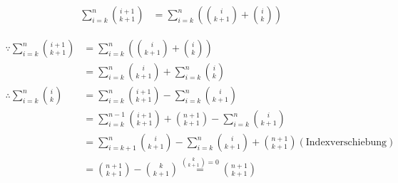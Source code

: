 \documentclass{article}
\begin{document}
\begin{flushleft}
\begin{equation*}
    \begin{aligned}
        \sum_{i=k}^n\binom{i+1}{k+1} &= \sum_{i=k}^n\left(\binom{i}{k+1}+\binom{i}{k}\right)
    \end{aligned}
\end{equation*}
\par
{}
\begin{equation*}
    \begin{aligned}
        \because
        \sum_{i=k}^n\binom{i+1}{k+1} &= \sum_{i=k}^n\left(\binom{i}{k+1}+\binom{i}{k}\right)\\
        &= \sum_{i=k}^n\binom{i}{k+1} + \sum_{i=k}^n\binom{i}{k}\\
        \therefore
        \sum_{i=k}^n\binom{i}{k} &= \sum_{i=k}^n\binom{i+1}{k+1} - \sum_{i=k}^n\binom{i}{k+1}\\
        &= \sum_{i=k}^{n-1}\binom{i+1}{k+1} + \binom{n+1}{k+1} - \sum_{i=k}^n\binom{i}{k+1}\\
        &= \sum_{i=k+1}^n\binom{i}{k+1} - \sum_{i=k}^n\binom{i}{k+1} + \binom{n+1}{k+1} (\text{Indexverschiebung})\\
        &= \binom{n+1}{k+1} - \binom{k}{k+1} \overset{\binom{k}{k+1}=0}{=} \binom{n+1}{k+1}
    \end{aligned}
\end{equation*}
\end{flushleft}
\end{document}
